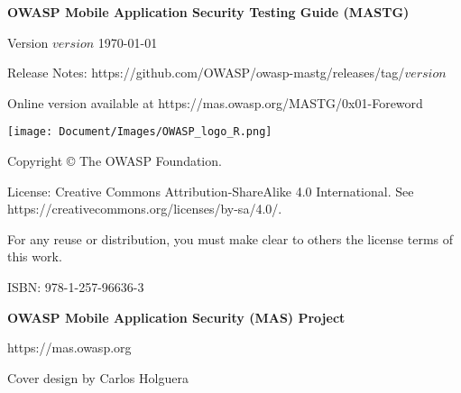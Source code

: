 \thispagestyle{empty} %

\textbf{OWASP Mobile Application Security Testing Guide (MASTG)}

Version $version$ \today

Release Notes: https://github.com/OWASP/owasp-mastg/releases/tag/$version$

Online version available at https://mas.owasp.org/MASTG/0x01-Foreword

\texttt{[image: Document/Images/OWASP\_logo\_R.png]}

Copyright © The OWASP Foundation. 

License: Creative Commons Attribution-ShareAlike 4.0 International. See https://creativecommons.org/licenses/by-sa/4.0/.

For any reuse or distribution, you must make clear to others the license terms of this work.

ISBN: 978-1-257-96636-3 


\textbf{OWASP Mobile Application Security (MAS) Project}

https://mas.owasp.org


Cover design by Carlos Holguera